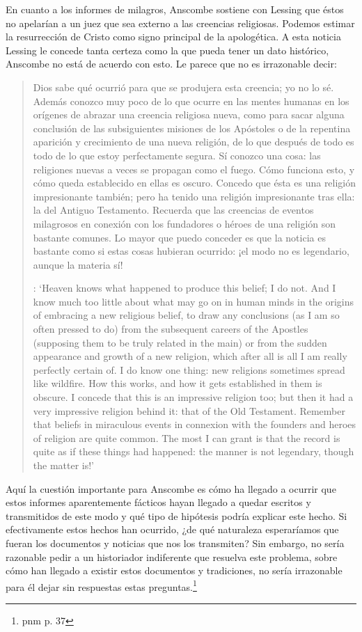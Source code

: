 En cuanto a los informes de milagros, Anscombe sostiene con Lessing que éstos no
apelarían a un juez que sea externo a las creencias religiosas. Podemos estimar
la resurrección de Cristo como signo principal de la apologética. A esta noticia
Lessing le concede tanta certeza como la que pueda tener un dato histórico,
Anscombe no está de acuerdo con esto. Le parece que no es irrazonable decir:
\blockquote[{\cite[26]{pnm}}: `Heaven knows what happened to produce this
belief; I do not. And I know much too little about what may go on in human minds
in the origins of embracing a new religious belief, to draw any conclusions (as
I am so often pressed to do) from the subsequent careers of the Apostles
(supposing them to be truly related in the main) or from the sudden appearance
and growth of a new religion, which after all is all I am really perfectly
certain of. I do know one thing: new religions sometimes spread like wildfire.
How this works, and how it gets established in them is obscure. I concede that
this is an impressive religion too; but then it had a very impressive religion
behind it: that of the Old Testament. Remember that beliefs in miraculous events
in connexion with the founders and heroes of religion are quite common. The most
I can grant is that the record is quite as if these things had happened: the
manner is not legendary, though the matter is!']{Dios sabe qué ocurrió para que
  se produjera esta creencia; yo no lo sé. Además conozco muy poco de lo que
  ocurre en las mentes humanas en los orígenes de abrazar una creencia religiosa
  nueva, como para sacar alguna conclusión \textelp{} de las subsiguientes
  misiones de los Apóstoles \textelp{} o de la repentina aparición y crecimiento
de una nueva religión, de lo que después de todo es todo de lo que estoy
perfectamente segura. Sí conozco una cosa: las religiones nuevas a veces se
propagan como el fuego. Cómo funciona esto, y cómo queda establecido en ellas es
oscuro. Concedo que ésta es una religión impresionante también; pero ha tenido
una religión impresionante tras ella: la del Antiguo Testamento. Recuerda que
las creencias de eventos milagrosos en conexión con los fundadores o héroes de
una religión son bastante comunes. Lo mayor que puedo conceder es que la noticia
es bastante como si estas cosas hubieran ocurrido: ¡el modo no es legendario,
aunque la materia sí!}
Aquí la cuestión importante para Anscombe es cómo ha llegado a ocurrir que estos
informes aparentemente fácticos hayan llegado a quedar escritos y transmitidos
de este modo y qué tipo de hipótesis podría explicar este hecho. Si
efectivamente estos hechos han ocurrido, ¿de qué naturaleza esperaríamos que
fueran los documentos y noticias que nos los transmiten? Sin embargo, no sería
razonable pedir a un historiador indiferente que resuelva este problema, sobre
cómo han llegado a existir estos documentos y tradiciones, no sería irrazonable
para él dejar sin respuestas estas preguntas.\footnote{pnm p. 37}

